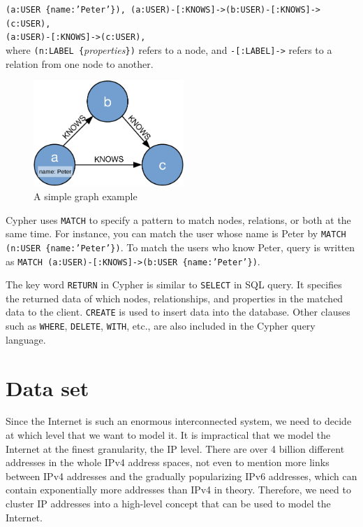 \documentclass[letterpaper,twocolumn,11pt]{article}
\begin{document}
{\small
\texttt{(a:USER \{name:'Peter'\}),
\texttt{(a:USER)-[:KNOWS]->(b:USER)-[:KNOWS]->(c:USER)}, \\
\texttt{(a:USER)-[:KNOWS]->(c:USER)}, \\
}
where \texttt{(n:LABEL \{}\textit{properties}\texttt{\})} refers to a node, and \texttt{-[:LABEL]->} refers to a relation from one node to another.

\begin{figure}[t]
\centering
\includegraphics[height=4cm]{figs/example.pdf}
\caption{A simple graph example}
\label{fig:example}
\end{figure}

Cypher uses \texttt{MATCH} to specify a pattern to match nodes, relations, or both at the same time. For instance, you can match the user whose name is Peter by \texttt{MATCH (n:USER \{name:'Peter'\})}. To match the users who know Peter, query is written as \texttt{MATCH (a:USER)-[:KNOWS]->(b:USER \{name:'Peter'\})}.

The key word \texttt{RETURN} in Cypher is similar to \texttt{SELECT} in SQL query. It specifies the returned data of which nodes, relationships, and properties in the matched data to the client. \texttt{CREATE} is used to insert data into the database. Other clauses such as \texttt{WHERE}, \texttt{DELETE}, \texttt{WITH}, etc., are also included in the Cypher query language.

\section{Data set}

Since the Internet is such an enormous interconnected system, we need to decide at which level that we want to model it. It is impractical that we model the Internet at the finest granularity, the IP level. There are over 4 billion different addresses in the whole IPv4 address spaces, not even to mention more links between IPv4 addresses and the gradually popularizing IPv6 addresses, which can contain exponentially more addresses than IPv4 in theory. Therefore, we need to cluster IP addresses into a high-level concept that can be used to model the Internet. 

}
\end{document}
